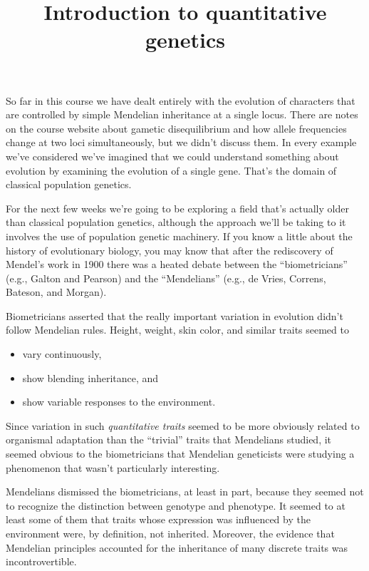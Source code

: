 \documentclass[12pt]{article}
\title{Introduction to quantitative genetics}
\begin{document}
\maketitle

\thispagestyle{first}

So far in this course we have dealt entirely with the evolution of
characters that are controlled by simple Mendelian inheritance at a
single locus. There are notes on the course website about gametic
disequilibrium and how allele frequencies change at two loci
simultaneously, but we didn't discuss them. In every example we've
considered we've imagined that we could understand something about
evolution by examining the evolution of a single gene. That's the
domain of classical population genetics.

For the next few weeks we're going to be exploring a field that's
actually older than classical population genetics, although the
approach we'll be taking to it involves the use of population genetic
machinery. If you know a little about the history of evolutionary
biology, you may know that after the rediscovery of Mendel's work in
1900 there was a heated debate between the ``biometricians'' (e.g.,
Galton and Pearson) and the ``Mendelians'' (e.g., de Vries, Correns,
Bateson, and Morgan).

Biometricians asserted that the really important variation in
evolution didn't follow Mendelian rules. Height, weight, skin color,
and similar traits seemed to 

\begin{itemize}

\item vary continuously,

\item show blending inheritance, and

\item show variable responses to the environment.

\end{itemize}

\noindent Since variation in such {\it quantitative traits\/} seemed
to be more obviously related to organismal adaptation than the
``trivial'' traits that Mendelians studied, it seemed obvious to the
biometricians that Mendelian geneticists were studying a phenomenon
that wasn't particularly interesting.

Mendelians dismissed the biometricians, at least in part, because they
seemed not to recognize the distinction between genotype and
phenotype. It seemed to at least some of them that traits whose
expression was influenced by the environment were, by definition, not
inherited. Moreover, the evidence that Mendelian principles accounted
for the inheritance of many discrete traits was incontrovertible.
\end{document}
